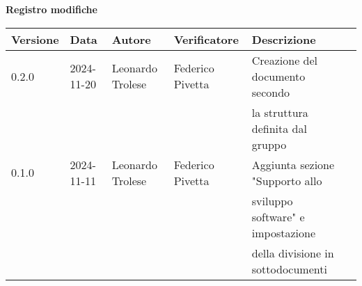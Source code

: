 \begin{center}
    \textbf{Registro modifiche}\\
    \vspace{2mm}

    \begin{tabular}{|l|l|l|l|l|l|}
    \hline
    \textbf{Versione} & \textbf{Data} & \textbf{Autore} & \textbf{Verificatore} & \textbf{Descrizione}\\
    \hline
    0.2.0 & 2024-11-20  & Leonardo Trolese & Federico Pivetta  & Creazione del documento secondo \\ & & & & la struttura definita dal gruppo\\
    \hline
    0.1.0 & 2024-11-11  & Leonardo Trolese & Federico Pivetta  & Aggiunta sezione "Supporto allo \\ & & & & sviluppo software" e impostazione \\ & & & & della divisione in sottodocumenti\\
    \hline
    \end{tabular}
\end{center}